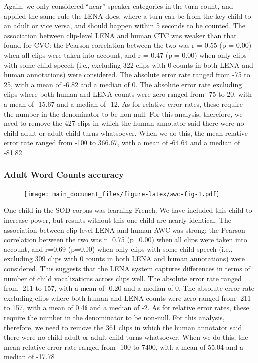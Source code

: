 \documentclass[english,floatsintext,man]{apa6}
\begin{document}
Again, we only considered \enquote{near} speaker categories in the turn
count, and applied the same rule the LENA does, where a turn can be from
the key child to an adult or vice versa, and should happen within 5
seconds to be counted. The association between clip-level LENA and human
CTC was weaker than that found for CVC: the Pearson correlation between
the two was r = 0.55 (p = 0.00) when all clips were taken into account,
and r = 0.47 (p = 0.00) when only clips with some child speech (i.e.,
excluding 322 clips with 0 counts in both LENA and human annotations)
were considered. The absolute error rate ranged from -75 to 25, with a
mean of -6.82 and a median of 0. The absolute error rate excluding clips
where both human and LENA counts were zero ranged from -75 to 20, with a
mean of -15.67 and a median of -12. As for relative error rates, these
require the number in the denominator to be non-null. For this analysis,
therefore, we need to remove the 427 clips in which the human annotator
said there were no child-adult or adult-child turns whatsoever. When we
do this, the mean relative error rate ranged from -100 to 366.67, with a
mean of -64.64 and a median of -81.82

\subsubsection{Adult Word Counts
accuracy}\label{adult-word-counts-accuracy}

\begin{figure}
\centering
\texttt{[image: main\_document\_files/figure-latex/awc-fig-1.pdf]}
\caption{}
\end{figure}

One child in the SOD corpus was learning French. We have included this
child to increase power, but results without this one child are nearly
identical. The association between clip-level LENA and human AWC was
strong: the Pearson correlation between the two was r=0.75 (p=0.00) when
all clips were taken into account, and r=0.69 (p=0.00) when only clips
with some child speech (i.e., excluding 309 clips with 0 counts in both
LENA and human annotations) were considered. This suggests that the LENA
system captures differences in terms of number of child vocalizations
across clips well. The absolute error rate ranged from -211 to 157, with
a mean of -0.20 and a median of 0. The absolute error rate excluding
clips where both human and LENA counts were zero ranged from -211 to
157, with a mean of 0.46 and a median of -2. As for relative error
rates, these require the number in the denominator to be non-null. For
this analysis, therefore, we need to remove the 361 clips in which the
human annotator said there were no child-adult or adult-child turns
whatsoever. When we do this, the mean relative error rate ranged from
-100 to 7400, with a mean of 55.04 and a median of -17.78
\end{document}
